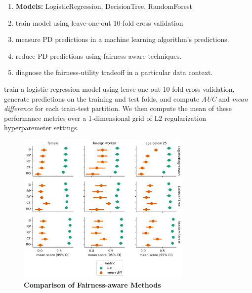 \documentclass{acm_proc_article-sp}
\begin{document}
\begin{enumerate}
  \item \textbf{Models:} LogisticRegression, DecisionTree, RandomForest
  \item train model using leave-one-out 10-fold cross validation
  \item measure PD predictions in a machine learning algorithm's predictions.
  \item reduce PD predictions using fairness-aware techniques.
  \item diagnose the fairness-utility tradeoff in a particular data context.
\end{enumerate}
train a logistic regression model using
leave-one-out 10-fold cross validation, generate predictions on the training and
test folds, and compute \emph{AUC} and \emph{mean difference} for each
train-test partition. We then compute the mean of these performance metrics
over a 1-dimensional grid of L2 regularization hyperparemeter settings.

\begin{figure}[h]
\centering
\includegraphics[width=8.5cm]{IMG/fairness_aware_comparison.png}
\caption{
  \textbf{Comparison of Fairness-aware Methods}
  }
\label{figure-1-comparison-fa-methods}
\end{figure}
\end{document}
